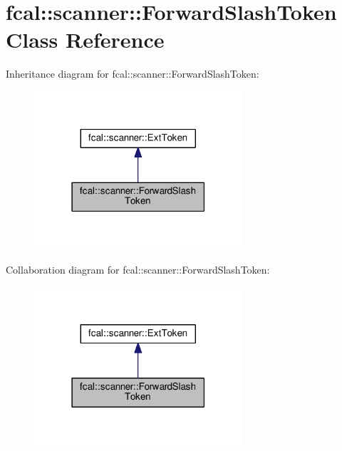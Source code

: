 \hypertarget{classfcal_1_1scanner_1_1ForwardSlashToken}{}\section{fcal\+:\+:scanner\+:\+:Forward\+Slash\+Token Class Reference}
\label{classfcal_1_1scanner_1_1ForwardSlashToken}


Inheritance diagram for fcal\+:\+:scanner\+:\+:Forward\+Slash\+Token\+:
\nopagebreak
\begin{figure}[H]
\begin{center}
\leavevmode
\includegraphics[width=219pt]{classfcal_1_1scanner_1_1ForwardSlashToken__inherit__graph}
\end{center}
\end{figure}


Collaboration diagram for fcal\+:\+:scanner\+:\+:Forward\+Slash\+Token\+:
\nopagebreak
\begin{figure}[H]
\begin{center}
\leavevmode
\includegraphics[width=219pt]{classfcal_1_1scanner_1_1ForwardSlashToken__coll__graph}
\end{center}
\end{figure}

